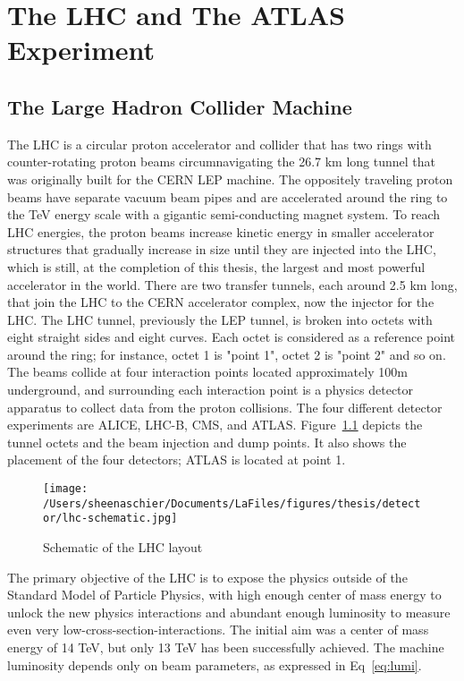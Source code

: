 \chapter{The LHC and The ATLAS Experiment}
\section{The Large Hadron Collider Machine}
\label{sec:LHC}

The LHC is a circular proton accelerator and collider that has two rings with counter-rotating proton beams circumnavigating the 26.7 km long tunnel that was originally built for the CERN LEP machine.  The oppositely traveling proton beams have separate vacuum beam pipes and are accelerated around the ring to the TeV energy scale with a gigantic semi-conducting magnet system.  To reach LHC energies, the proton beams increase kinetic energy in smaller accelerator structures that gradually increase in size until they are injected into the LHC, which is still, at the completion of this thesis, the largest and most powerful accelerator in the world.  There are two transfer tunnels, each around 2.5 km long, that join the LHC to the CERN accelerator complex, now the injector for the LHC.  The LHC tunnel, previously the LEP tunnel, is broken into octets with eight straight sides and eight curves.   Each octet is considered as a reference point around the ring; for instance, octet 1 is "point 1", octet 2 is "point 2" and so on.  The beams collide at four interaction points located approximately 100m underground, and surrounding each interaction point is a physics detector apparatus to collect data from the proton collisions.  The four different detector experiments are ALICE, LHC-B, CMS, and ATLAS.  Figure~\ref{fig:lhc} depicts the tunnel octets and the beam injection and dump points.  It also shows the placement of the four detectors; ATLAS is located at point 1.

  \begin{figure}[tbp]
    \centering
 \texttt{[image: /Users/sheenaschier/Documents/LaFiles/figures/thesis/detector/lhc-schematic.jpg]}
    \caption{Schematic of the LHC layout}
   \label{fig:lhc}
 \end{figure}
The primary objective of the LHC is to expose the physics outside of the Standard Model of Particle Physics, with high enough center of mass energy to unlock the new physics interactions and abundant enough luminosity to measure even very low-cross-section-interactions.  The initial aim was a center of mass energy of 14 TeV, but only 13 TeV has been successfully achieved.  The machine luminosity depends only on beam parameters, as expressed in Eq~\ref{eq:lumi}.

